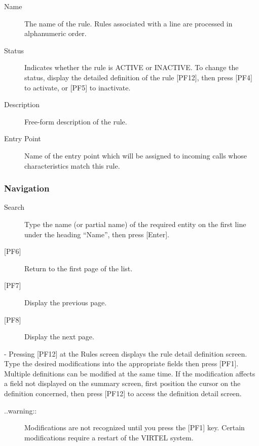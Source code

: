 \documentclass[letterpaper,10pt,english]{sphinxmanual}
\begin{document}
\begin{description}
\item[{Name}] \leavevmode
The name of the rule. Rules associated with a line are processed in alphanumeric order.

\item[{Status}] \leavevmode
Indicates whether the rule is ACTIVE or INACTIVE. To change the status, display the detailed definition of the rule {[}PF12{]}, then press {[}PF4{]} to activate, or {[}PF5{]} to inactivate.

\item[{Description}] \leavevmode
Free-form description of the rule.

\item[{Entry Point}] \leavevmode
Name of the entry point which will be assigned to incoming calls whose characteristics match this rule.

\end{description}


\subsubsection{Navigation}
\label{\detokenize{connectivity_guide:id45}}\begin{description}
\item[{Search}] \leavevmode
Type the name (or partial name) of the required entity on the first line under the heading “Name”, then press {[}Enter{]}.

\item[{{[}PF6{]}}] \leavevmode
Return to the first page of the list.

\item[{{[}PF7{]}}] \leavevmode
Display the previous page.

\item[{{[}PF8{]}}] \leavevmode
Display the next page.

\end{description}

 - Pressing {[}PF12{]} at the Rules screen displays the rule detail definition screen. Type the desired modifications into the appropriate fields then press {[}PF1{]}. Multiple definitions can be modified at the same time. If the modification affects a field not displayed on the summary screen, first position the cursor on the definition concerned, then press {[}PF12{]} to access the definition detail screen.
\begin{description}
\item[{..warning::}] \leavevmode
Modifications are not recognized until you press the {[}PF1{]} key. Certain modifications require a restart of the VIRTEL system.

\end{description}
\end{document}
